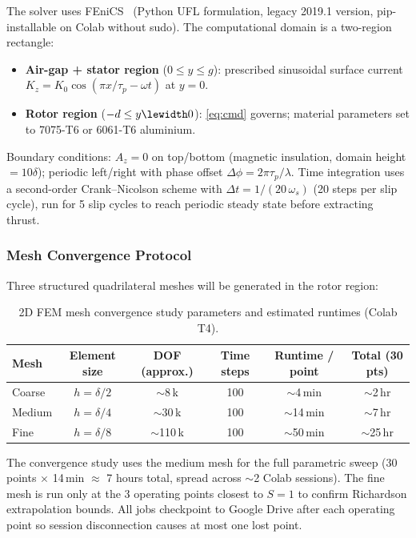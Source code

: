 \documentclass[12pt,letterpaper]{article}
\begin{document}
The solver uses FEniCS~\cite{AlnaesEtal2015} (Python UFL formulation, legacy
2019.1 version, pip-installable on Colab without sudo). The computational domain
is a two-region rectangle:

\begin{itemize}[noitemsep]
  \item \textbf{Air-gap + stator region} ($0 \leq y \leq g$): prescribed sinusoidal
    surface current $K_z = K_0\cos(\pi x/\tau_p - \omega t)$ at $y = 0$.
  \item \textbf{Rotor region} ($-d \leq y \lewidth 0$): \cref{eq:cmd} governs;
    material parameters set to 7075-T6 or 6061-T6 aluminium.
\end{itemize}

Boundary conditions: $A_z = 0$ on top/bottom (magnetic insulation, domain height
$= 10\delta$); periodic left/right with phase offset $\Delta\phi = 2\pi\tau_p/\lambda$.
Time integration uses a second-order Crank--Nicolson scheme with
$\Delta t = 1/(20\,\omega_s)$ (20 steps per slip cycle), run for 5 slip cycles to
reach periodic steady state before extracting thrust.

\subsubsection{Mesh Convergence Protocol}

Three structured quadrilateral meshes will be generated in the rotor region:

\begin{table}[H]
\centering
\caption{2D FEM mesh convergence study parameters and estimated runtimes (Colab T4).}
\label{tab:mesh2d}
\begin{tabular}{lccccc}
\toprule
\textbf{Mesh} & \textbf{Element size} & \textbf{DOF (approx.)} & \textbf{Time steps} & \textbf{Runtime / point} & \textbf{Total (30 pts)} \\
\midrule
Coarse & $h = \delta/2$  & $\sim$8\,k   & 100 & $\sim$4\,min  & $\sim$2\,hr \\
Medium & $h = \delta/4$  & $\sim$30\,k  & 100 & $\sim$14\,min & $\sim$7\,hr \\
Fine   & $h = \delta/8$  & $\sim$110\,k & 100 & $\sim$50\,min & $\sim$25\,hr \\
\bottomrule
\end{tabular}
\end{table}

\noindent The convergence study uses the medium mesh for the full parametric sweep
(30 points $\times$ 14\,min $\approx$ 7 hours total, spread across $\sim$2 Colab
sessions). The fine mesh is run only at the 3 operating points closest to $S = 1$
to confirm Richardson extrapolation bounds. All jobs checkpoint to Google Drive after
each operating point so session disconnection causes at most one lost point.
\end{document}
